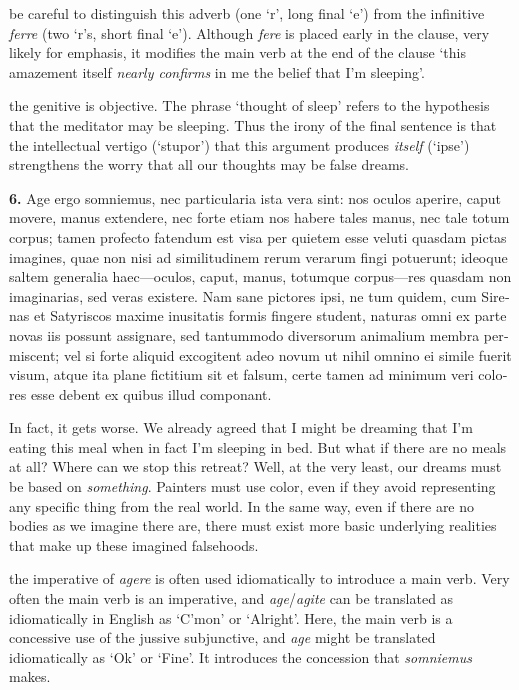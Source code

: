  be careful to distinguish this adverb (one `r', long final `e') from the infinitive \textit{ferre} (two `r's, short final `e'). Although \textit{fere} is placed early in the clause, very likely for emphasis, it modifies the main verb at the end of the clause `this amazement itself \textit{nearly confirms} in me the belief that I'm sleeping'.

 the genitive is objective. The phrase `thought of sleep' refers to the hypothesis that the meditator may be sleeping. Thus the irony of the final sentence is that the intellectual vertigo (`stupor') that this argument produces \textit{itself} (`ipse') strengthens the worry that all our thoughts may be false dreams.

\clearpage

\beginnumbering
\pstart
\begin{latin}
\textenglish{\textbf{6.}} Age ergo somniemus, nec particularia ista vera sint: nos oculos aperire, caput movere, manus extendere, nec forte etiam nos habere tales manus, nec tale totum corpus; tamen profecto fatendum est visa per quietem esse veluti quasdam pictas imagines, quae non nisi ad similitudinem rerum verarum fingi potuerunt; ideoque saltem generalia haec---oculos, caput, manus, totumque corpus---res quasdam non imaginarias, sed veras existere. Nam sane pictores ipsi, ne tum quidem, cum Sirenas et Satyriscos maxime inusitatis formis fingere student, naturas omni ex parte novas iis possunt assignare, sed tantummodo diversorum animalium membra permiscent; vel si forte aliquid excogitent adeo novum ut nihil omnino ei simile fuerit visum, atque ita plane fictitium sit et falsum, certe tamen ad minimum veri colores esse debent ex quibus illud componant.
\end{latin}
\pend
\endnumbering

\prenotes

In fact, it gets worse. We already agreed that I might be dreaming that I'm eating this meal when in fact I'm sleeping in bed. But what if there are no meals at all? Where can we stop this retreat? Well, at the very least, our dreams must be based on \textit{something}. Painters must use color, even if they avoid representing any specific thing from the real world. In the same way, even if there are no bodies as we imagine there are, there must exist more basic underlying realities that make up these imagined falsehoods.

 the imperative of \textit{agere} is often used idiomatically to introduce a main verb. Very often the main verb is an imperative, and \textit{age}/\textit{agite} can be translated as idiomatically in English as `C'mon' or `Alright'. Here, the main verb is a concessive use of the jussive subjunctive, and \textit{age} might be translated idiomatically as `Ok' or `Fine'. It introduces the concession that \textit{somniemus} makes.

